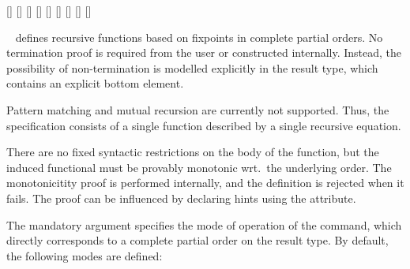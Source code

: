\begin{isabellebody}
\begin{isamarkuptext}
  \begin{railoutput}
[]
\rail@bar
{}
[]
\rail@endbar
{}[]
[]
[]
[]
[]
\rail@bar
{}
[]
\rail@endbar
{}[]
\rail@end
\end{railoutput}


  \begin{description}

  \item \hyperlink{command.HOL.partial-function}{\mbox{}}~ defines
  recursive functions based on fixpoints in complete partial
  orders. No termination proof is required from the user or
  constructed internally. Instead, the possibility of non-termination
  is modelled explicitly in the result type, which contains an
  explicit bottom element.

  Pattern matching and mutual recursion are currently not supported.
  Thus, the specification consists of a single function described by a
  single recursive equation.

  There are no fixed syntactic restrictions on the body of the
  function, but the induced functional must be provably monotonic
  wrt.\ the underlying order.  The monotonicitity proof is performed
  internally, and the definition is rejected when it fails. The proof
  can be influenced by declaring hints using the
  \hyperlink{attribute.HOL.partial-function-mono}{\mbox{}} attribute.

  The mandatory  argument specifies the mode of operation
  of the command, which directly corresponds to a complete partial
  order on the result type. By default, the following modes are
  defined:


\end{description}
\end{isamarkuptext}
\end{isabellebody}
